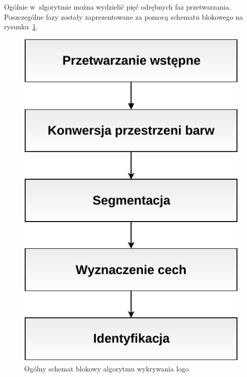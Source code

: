 
Ogólnie w~algorytmie można wydzielić pięć odrębnych faz przetwarzania. Poszczególne fazy zostały zaprezentowane za pomocą schematu blokowego na rysunku~\ref{fig:algorithm-overview}.

\begin{figure}
    \centering
    \includegraphics[width=0.6\columnwidth]{figures/algorithmOverview.pdf}
    \caption{Ogólny schemat blokowy algorytmu wykrywania logo \bk}
    \label{fig:algorithm-overview}
\end{figure}